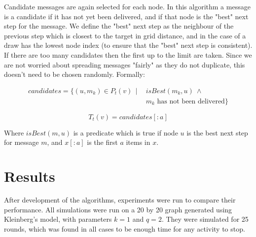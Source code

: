 \documentclass[bsc,frontabs,twoside,singlespacing,parskip,deptreport]{infthesis}     %
\begin{document}
Candidate messages are again selected for each node. In this algorithm a message is a candidate if it has not yet been delivered, and if that node is the "best" next step for the message. We define the "best" next step as the neighbour of the previous step which is closest to the target in grid distance, and in the case of a draw has the lowest node index (to ensure that the "best" next step is consistent). If there are too many candidates then the first up to the limit are taken. Since we are not worried about spreading messages "fairly" as they do not duplicate, this doesn't need to be chosen randomly. Formally:

\begin{equation}
\begin{split}
candidates = \{ (u, m_{k}) \in P_{t}(v) \:\: | \:\: & isBest(m_{k}, u) \: \wedge \\
& m_{k} \mbox{ has not been delivered} \}
\end{split}
\end{equation}

\begin{equation}
T_{t}(v) = candidates[:a]
\end{equation}

Where $isBest(m, u)$ is a predicate which is true if node $u$ is the best next step for message $m$, and $x[:a]$ is the first $a$ items in $x$.


\chapter{Results}
After development of the algorithms, experiments were run to compare their performance. All simulations were run on a 20 by 20 graph generated using Kleinberg's model, with parameters $k = 1$ and $q = 2$. They were simulated for 25 rounds, which was found in all cases to be enough time for any activity to stop. 
\end{document}
